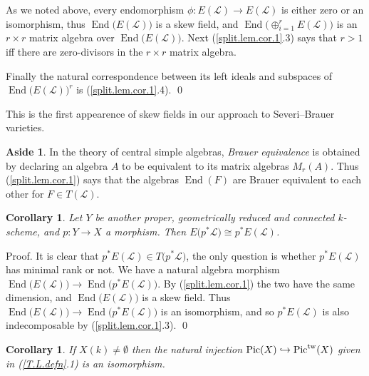 \documentclass{amsart}
\newtheorem{cor}[thm]{Corollary}
\theoremstyle{definition}
\newtheorem{aside}[thm]{Aside}
\theoremstyle{remark}
\newcommand{\pic}[0]{\operatorname{Pic}}
\newcommand{\pictw}[0]{\operatorname{Pic}^{\rm tw}}
\def\into{\DOTSB\lhook\joinrel\to}
\newcommand{\End}[0]{\operatorname{End}}
\begin{document}
As we noted above,   every endomorphism $\phi:E({\mathcal L})\to E({\mathcal L})$
 is either zero or an isomorphism, thus $\End\bigl(E( {\mathcal L})\bigr)$ is a skew field, and  $\End\bigl(\oplus_{i=1}^r E( {\mathcal L})\bigr)$ is an $r\times r$ matrix
algebra over $\End\bigl(E( {\mathcal L})\bigr)$.
Next  (\ref{split.lem.cor.1}.3) says that 
 $r>1$ iff
there are zero-divisors in the $r\times r$ matrix
algebra.

Finally the natural correspondence between its left ideals and
subspaces of $\End\bigl(E( {\mathcal L})\bigr)^r$ is 
(\ref{split.lem.cor.1}.4).   \qed

\medskip

This is the first appearence of skew fields in our approach to
Severi--Brauer varieties.



\begin{aside} \label{brau.eq.aside} 
In the theory of  central simple algebras,
{\it Brauer equivalence} is obtained by  declaring an algebra $A$ 
to be equivalent to its    matrix algebras $M_{r}(A)$. Thus (\ref{split.lem.cor.1}) says that
the algebras $\End(F)$ are Brauer equivalent to each other for  $F\in T({\mathcal L})$.
\end{aside}

\begin{cor} \label{split.lem.cor.2}
Let $Y$ be another  proper, 
 geometrically reduced and  connected $k$-scheme, and $p:Y\to X$ a morphism. Then $E\bigl(p^* {\mathcal L}\bigr)\cong
p^*E( {\mathcal L})$.
\end{cor}

Proof. It is clear that $p^*E( {\mathcal L})\in T\bigl(p^* {\mathcal L}\bigr)$, the only question is whether $p^*E( {\mathcal L})$ has minimal rank or not.  We have a natural algebra morphism
$\End\bigl(E({\mathcal L})\bigr)\to \End\bigl(p^*E({\mathcal L})\bigr)$.
By (\ref{split.lem.cor.1}) the two have the same dimension, and
$\End\bigl(E({\mathcal L})\bigr)$ is a skew field. Thus 
$\End\bigl(E({\mathcal L})\bigr)\to \End\bigl(p^*E({\mathcal L})\bigr)$ is an isomorphism, and
so $p^*E({\mathcal L})$ is also indecomposable by (\ref{split.lem.cor.1}.3). \qed




\begin{cor} \label{split.lem.cor.3} If $X(k)\neq \emptyset$ then  the
 natural injection
$\pic(X)\into \pictw(X)$ given in (\ref{T.L.defn}.1) is an isomorphism.
\end{cor}
\end{document}
